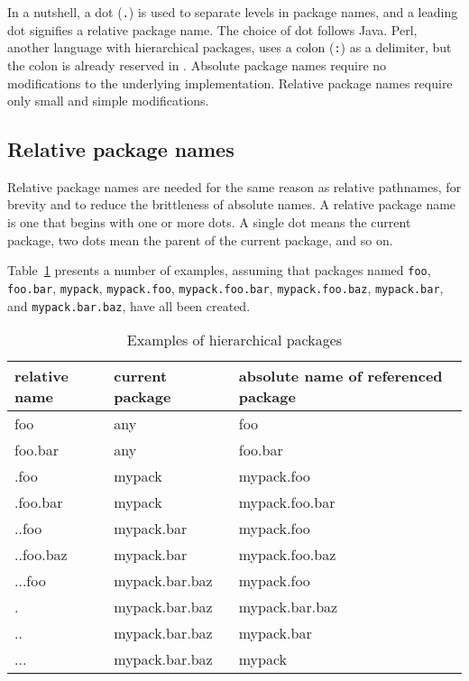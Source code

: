 In a nutshell, a dot (\verb|.|) is used to separate levels in package
names, and a leading dot signifies a relative package name. The choice
of dot follows Java. Perl, another language with hierarchical
packages, uses a colon (\verb|:|) as a delimiter, but the colon is
already reserved in \clisp{}. Absolute package names require no
modifications to the underlying \clisp{} implementation. Relative
package names require only small and simple modifications.


\subsection{Relative package names}

Relative package names are needed for the same reason as relative
pathnames, for brevity and to reduce the brittleness of absolute
names. A relative package name is one that begins with one or more
dots. A single dot means the current package, two dots mean the parent
of the current package, and so on.

Table~\ref{tbl:hierarchical-packages} presents a number of examples,
assuming that packages named \verb|foo|, \verb|foo.bar|,
\verb|mypack|, \verb|mypack.foo|, \verb|mypack.foo.bar|,
\verb|mypack.foo.baz|, \verb|mypack.bar|, and \verb|mypack.bar.baz|,
have all been created.

\begin{table}[h]
\begin{center}
\begin{tabular}{|l|l|l|}
\hline
relative name   &  current package & absolute name of referenced package \\
\hline
foo &               any  &                      foo \\
foo.bar &           any &                       foo.bar \\
.foo &              mypack &                    mypack.foo \\
 .foo.bar &         mypack &                    mypack.foo.bar \\
 ..foo &            mypack.bar &                mypack.foo \\
 ..foo.baz &        mypack.bar &                mypack.foo.baz \\
 ...foo &           mypack.bar.baz &            mypack.foo \\
 . &                mypack.bar.baz &            mypack.bar.baz \\
 .. &               mypack.bar.baz &            mypack.bar \\
 ... &              mypack.bar.baz &            mypack \\
\hline
\end{tabular}
\end{center}
\caption{Examples of hierarchical packages}
\label{tbl:hierarchical-packages}
\end{table}

